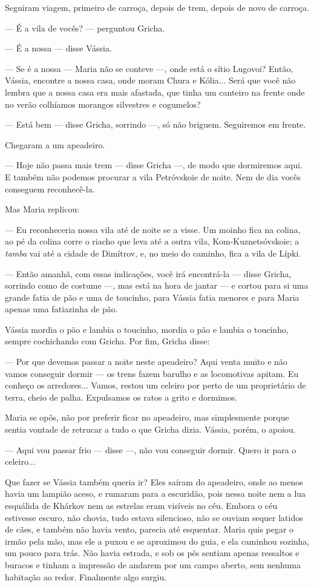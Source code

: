 Seguiram viagem, primeiro de carroça, depois de trem, depois de novo de
carroça.

--- É a vila de vocês? --- perguntou Gricha.

--- É a nossa --- disse Vássia.

--- Se é a nossa --- Maria não se conteve ---, onde está o sítio
Lugovoi? Então, Vássia, encontre a nossa casa, onde moram Chura e
Kólia... Será que você não lembra que a nossa casa era mais afastada,
que tinha um canteiro na frente onde no verão colhíamos morangos
silvestres e cogumelos?

--- Está bem --- disse Gricha, sorrindo ---, só não briguem. Seguiremos
em frente.

Chegaram a um apeadeiro.

--- Hoje não passa mais trem --- disse Gricha ---, de modo que
dormiremos aqui. E também não podemos procurar a vila Petróvskoie de
noite. Nem de dia vocês conseguem reconhecê-la.

Mas Maria replicou:

--- Eu reconheceria nossa vila até de noite se a visse. Um moinho fica
na colina, ao pé da colina corre o riacho que leva até a outra vila,
Kom-Kuznetsóvskoie; a \emph{tamba} vai até a cidade de Dimítrov, e, no
meio do caminho, fica a vila de Lípki.

--- Então amanhã, com essas indicações, você irá encontrá-la --- disse
Gricha, sorrindo como de costume ---, mas está na hora de jantar --- e
cortou para si uma grande fatia de pão e uma de toucinho, para Vássia
fatia menores e para Maria apenas uma fatiazinha de pão.

Vássia mordia o pão e lambia o toucinho, mordia o pão e lambia o
toucinho, sempre cochichando com Gricha. Por fim, Gricha disse:

--- Por que devemos passar a noite neste apeadeiro? Aqui venta muito e
não vamos conseguir dormir --- os trens fazem barulho e as locomotivas
apitam. Eu conheço os arredores... Vamos, restou um celeiro por perto de
um proprietário de terra, cheio de palha. Expulsamos os ratos a grito e
dormimos.

Maria se opôs, não por preferir ficar no apeadeiro, mas simplesmente
porque sentia vontade de retrucar a tudo o que Gricha dizia. Vássia,
porém, o apoiou.

--- Aqui vou passar frio --- disse ---, não vou conseguir dormir. Quero
ir para o celeiro...

Que fazer se Vássia também queria ir? Eles saíram do apeadeiro, onde ao
menos havia um lampião aceso, e rumaram para a escuridão, pois nessa
noite nem a lua esquálida de Khárkov nem as estrelas eram visíveis no
céu. Embora o céu estivesse escuro, não chovia, tudo estava silencioso,
não se ouviam sequer latidos de cães, e também não havia vento, parecia
até esquentar. Maria quis pegar o irmão pela mão, mas ele a puxou e se
aproximou do guia, e ela caminhou sozinha, um pouco para trás. Não havia
estrada, e sob os pés sentiam apenas ressaltos e buracos e tinham a
impressão de andarem por um campo aberto, sem nenhuma habitação ao
redor. Finalmente algo surgiu.

